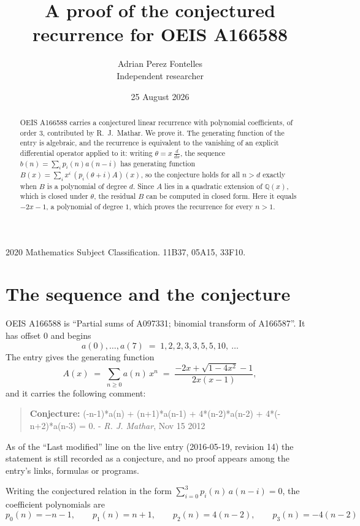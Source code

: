 \documentclass[11pt,a4paper]{article}
\title{A proof of the conjectured recurrence for OEIS A166588}
\author{Adrian Perez Fontelles\\ \small Independent researcher}
\date{25 August 2026}
\theoremstyle{plain}
\theoremstyle{definition}
\begin{document}
\maketitle

\begin{abstract}
OEIS A166588 carries a conjectured linear recurrence with polynomial coefficients, of
order 3, contributed by R.~J.~Mathar. We prove it. The generating function of the
entry is algebraic, and the recurrence is equivalent to the vanishing of an explicit
differential operator applied to it: writing $\theta=x\,\frac{d}{dx}$, the sequence
$b(n)=\sum_{i}p_{i}(n)a(n-i)$ has generating function
$B(x)=\sum_{i}x^{i}\,(p_{i}(\theta+i)A)(x)$, so the conjecture holds for all $n>d$ exactly
when $B$ is a polynomial of degree $d$. Since $A$ lies in a quadratic extension of
$\mathbb{Q}(x)$, which is closed under $\theta$, the residual $B$ can be computed in
closed form. Here it equals $- 2 x - 1$, a polynomial of degree $1$, which proves
the recurrence for every $n>1$.
\end{abstract}

\noindent\small 2020 Mathematics Subject Classification. 11B37, 05A15, 33F10.\normalsize

\section{The sequence and the conjecture}

OEIS A166588 is ``Partial sums of A097331; binomial transform of A166587''. It has offset $0$ and begins
\[
a(0),\dots,a(7)\;=\;1, 2, 2, 3, 3, 5, 5, 10,\ \dots
\]
The entry gives the generating function
\begin{equation}\label{eq:gf}
A(x)\;=\;\sum_{n\ge 0} a(n)\,x^{n}\;=\;\frac{- 2 x + \sqrt{1 - 4 x^{2}} - 1}{2 x \left(x - 1\right)} ,
\end{equation}
and it carries the following comment:
\begin{quote}\small
\textbf{Conjecture:} (-n-1)*a(n) + (n+1)*a(n-1) + 4*(n-2)*a(n-2) + 4*(-n+2)*a(n-3) = 0. - \emph{R. J. Mathar}, Nov 15 2012
\end{quote}
As of the ``Last modified'' line on the live entry (2016-05-19, revision 14) the
statement is still recorded as a conjecture, and no proof appears among the entry's links,
formulas or programs.

Writing the conjectured relation in the form $\sum_{i=0}^{3}p_{i}(n)\,a(n-i)=0$,
the coefficient polynomials are
\[
p_{0}(n)=- n - 1,\qquad p_{1}(n)=n + 1,\qquad p_{2}(n)=4 \left(n - 2\right),\qquad p_{3}(n)=- 4 \left(n - 2\right)
\]
\end{document}
